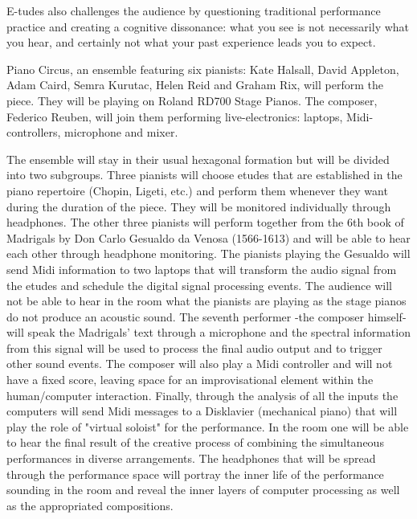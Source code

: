 E-tudes also challenges the audience by questioning traditional performance practice and creating a cognitive dissonance: what you see is not necessarily what you hear, and certainly not what your past experience leads you to expect.

	Piano Circus, an ensemble featuring six pianists: Kate Halsall, David Appleton, Adam Caird, Semra Kurutac, Helen Reid and Graham Rix, will perform the piece. They will be playing on Roland RD700 Stage Pianos. The composer, Federico Reuben, will join them performing live-electronics: laptops, Midi-controllers, microphone and mixer. 

	The ensemble will stay in their usual hexagonal formation but will be divided into two subgroups. Three pianists will choose etudes that are established in the piano repertoire (Chopin, Ligeti, etc.) and perform them whenever they want during the duration of the piece. They will be monitored individually through headphones. The other three pianists will perform together from the 6th book of Madrigals by Don Carlo Gesualdo da Venosa (1566-1613) and will be able to hear each other through headphone monitoring. The pianists playing the Gesualdo will send Midi information to two laptops that will transform the audio signal from the etudes and schedule the digital signal processing events. The audience will not be able to hear in the room what the pianists are playing as the stage pianos do not produce an acoustic sound. The seventh performer -the composer himself- will speak the Madrigals' text through a microphone and the spectral information from this signal will be used to process the final audio output and to trigger other sound events. The composer will also play a Midi controller and will not have a fixed score, leaving space for an improvisational element within the human/computer interaction. Finally, through the analysis of all the inputs the computers will send Midi messages to a Disklavier (mechanical piano) that will play the role of "virtual soloist" for the performance. In the room one will be able to hear the final result of the creative process of combining the simultaneous performances in diverse arrangements. The headphones that will be spread through the performance space will portray the inner life of the performance sounding in the room and reveal the inner layers of computer processing as well as the appropriated compositions.

